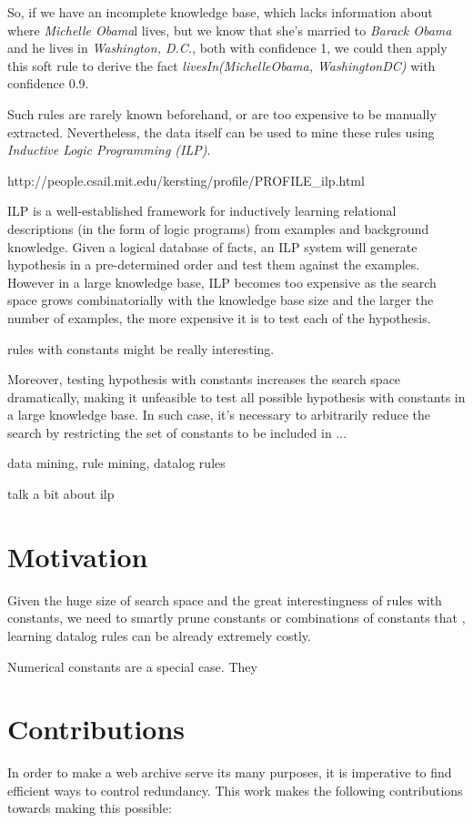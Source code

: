 So, if we have an incomplete knowledge base, which lacks information about where \emph{Michelle Obama}l lives, but we know that she's married to \emph{Barack Obama} and he lives in \emph{Washington, D.C.}, both with confidence 1, we could then apply this soft rule to derive the fact \emph{livesIn(MichelleObama, WashingtonDC)} with confidence 0.9.

Such rules are rarely known beforehand, or are too expensive to be manually extracted. Nevertheless, the data itself can be used to mine these rules using \emph{Inductive Logic Programming (ILP)}. 

http://people.csail.mit.edu/kersting/profile/PROFILE_ilp.html

ILP is a well-established framework for inductively learning relational descriptions (in the form of logic programs) from examples and background knowledge. Given a logical database of facts, an ILP system will generate hypothesis in a pre-determined order and test them against the examples. However in a large knowledge base, ILP becomes too expensive as the search space grows combinatorially with the knowledge base size and the larger the number of examples, the more expensive it is to test each of the hypothesis.

rules with constants might be really interesting.


Moreover, testing hypothesis with constants increases the search space dramatically, making it unfeasible to test all possible hypothesis with constants in a large knowledge base. In such case, it's necessary to arbitrarily reduce the search by restricting the set of constants to be included in ...

data mining, rule mining, datalog rules



talk a bit about ilp

\section{Motivation}
Given the huge size of search space and the great interestingness of rules with constants, we need to smartly prune constants or combinations of constants that  , learning datalog rules can be already extremely costly.

Numerical constants are a special case. They 

\section{Contributions}
In order to make a web archive serve its many purposes, it is imperative to
find efficient ways to control redundancy. This work makes the following
contributions towards making this possible:

